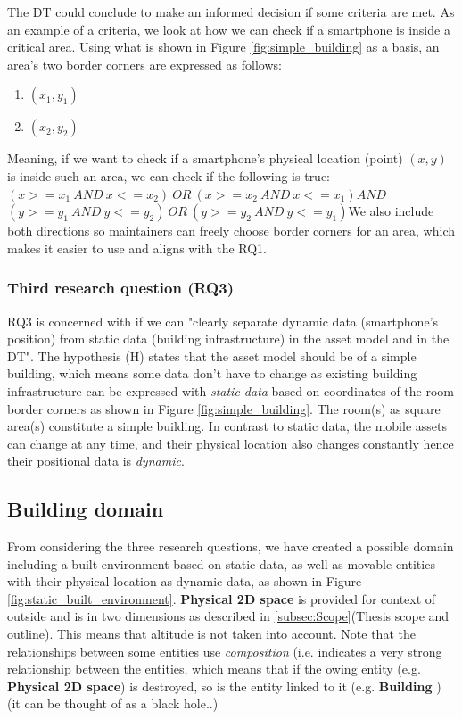 \documentclass{article}
\begin{document}
The DT could conclude to make an informed decision if some criteria are met. As an example of a criteria, we look at how we can check if a smartphone is inside a critical area. Using what is shown in Figure \ref{fig:simple_building} as a basis, an area's two border corners are expressed as follows:
\begin{enumerate}
    \item $(x_1, y_1)$
    \item $(x_2, y_2)$
\end{enumerate}
Meaning, if we want to check if a smartphone's physical location (point) $(x, y)$ is inside such an area, we can check if the following is true:\newline\newline$(x >= x_1\:AND\: x <= x_2)\:OR\:(x >= x_2\:AND\:x <= x_1)$\newline$AND$\newline$(y >= y_1\:AND\:y <= y_2)\:OR\:(y >= y_2\:AND\:y <= y_1)$\newline We also include both directions so maintainers can freely choose border corners for an area, which makes it easier to use and aligns with the RQ1.


\subsubsection{Third research question (RQ3)}
RQ3 is concerned with if we can "clearly separate dynamic data (smartphone's position) from static data (building infrastructure) in the asset model and in the DT". The hypothesis (H) states that the asset model should be of a simple building, which means some data don't have to change as existing building infrastructure can be expressed with \emph{static data} based on coordinates of the room border corners as shown in Figure \ref{fig:simple_building}. The room(s) as square area(s) constitute a simple building. In contrast to static data, the mobile assets can change at any time, and their physical location also changes constantly hence their positional data is \emph{dynamic}.

\subsection{Building domain}
From considering the three research questions, we have created a possible domain including a built environment based on static data, as well as movable entities with their physical location as dynamic data, as shown in Figure \ref{fig:static_built_environment}. \textbf{Physical 2D space} is provided for context of outside and is in two dimensions as described in \ref{subsec:Scope}(Thesis scope and outline). This means that altitude is not taken into account. Note that the relationships between some entities use \emph{composition} (i.e. indicates a very strong relationship between the entities, which means that if the owing entity (e.g. \textbf{Physical 2D space}) is destroyed, so is the entity linked to it (e.g. \textbf{Building} \cite{pilone_uml_2005}) (it can be thought of as a black hole..)
\end{document}
